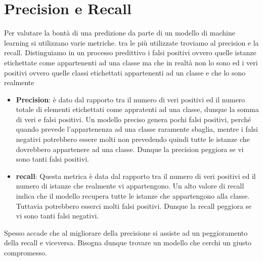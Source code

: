 \section{Precision e Recall}
Per valutare la bontà di una predizione da parte di un modello di machine learning si utilizzano varie metriche. tra le più utilizzate troviamo al precision e la recall. Distinguiamo in un processo predittivo i falsi positivi ovvero quelle istanze etichettate come appartenenti ad una classe ma che in realtà non lo sono ed i veri positivi ovvero quelle classi etichettati appartenenti ad un classe e che lo sono realmente
\begin{itemize}
    \item \textbf{Precision}: è dato dal rapporto tra il numero di veri positivi ed il numero totale di elementi etichettati come appratenti ad una classe, dunque la somma di veri e falsi positivi. Un modello preciso genera pochi falsi positivi, perché quando prevede l'appartenenza ad una classe raramente sbaglia, mentre i falsi negativi potrebbero essere molti non prevedendo quindi tutte le istanze che dovrebbero appartenere ad una classe. Dunque la precision peggiora se vi sono tanti falsi positivi. 
    \item \textbf{recall}: Questa metrica è data dal rapporto tra il numero di veri positivi ed il numero di istanze che realmente vi appartengono. Un alto valore di recall indica che il modello recupera tutte le istanze che appartengono alla classe. Tuttavia potrebbero esserci molti falsi positivi. Dunque la recall peggiora se vi sono tanti falsi negativi. 
\end{itemize}
Spesso accade che al migliorare della precisione si assiste ad un peggioramento della recall e viceversa. Bisogna dunque trovare un modello che cerchi un giusto compromesso. 
